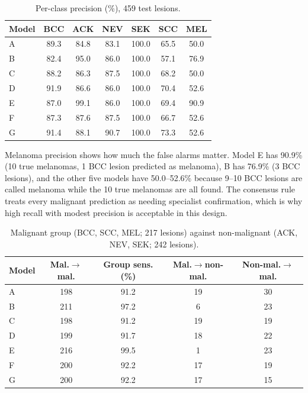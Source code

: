 \documentclass[conference]{IEEEtran}
\begin{document}
\begin{table}[!t]
\caption{Per-class precision (\%), 459 test lesions.}
\label{tab:prec}
\centering\scriptsize\setlength{\tabcolsep}{2.4pt}
\begin{tabular}{lcccccc}
\toprule
Model & BCC & ACK & NEV & SEK & SCC & MEL \\
\midrule
A & 89.3 & 84.8 & 83.1 & 100.0 & 65.5 & 50.0 \\
B & 82.4 & 95.0 & 86.0 & 100.0 & 57.1 & 76.9 \\
C & 88.2 & 86.3 & 87.5 & 100.0 & 68.2 & 50.0 \\
D & 91.9 & 86.6 & 86.0 & 100.0 & 70.4 & 52.6 \\
E & 87.0 & 99.1 & 86.0 & 100.0 & 69.4 & 90.9 \\
F & 87.3 & 87.6 & 87.5 & 100.0 & 66.7 & 52.6 \\
G & 91.4 & 88.1 & 90.7 & 100.0 & 73.3 & 52.6 \\
\bottomrule
\end{tabular}
\end{table}


Melanoma precision shows how much the false alarms matter. Model E has 90.9\% (10 true melanomas, 1 BCC lesion predicted as melanoma), B has 76.9\% (3 BCC lesions), and the other five models have 50.0--52.6\% because 9--10 BCC lesions are called melanoma while the 10 true melanomas are all found. The consensus rule treats every malignant prediction as needing specialist confirmation, which is why high recall with modest precision is acceptable in this design.

\begin{table}[!t]
\caption{Malignant group (BCC, SCC, MEL; 217 lesions) against non-malignant (ACK, NEV, SEK; 242 lesions).}
\label{tab:mal}
\centering\scriptsize\setlength{\tabcolsep}{2.4pt}
\begin{tabular}{lcccc}
\toprule
Model & Mal.$\to$mal. & Group sens. (\%) & Mal.$\to$non-mal. & Non-mal.$\to$mal. \\
\midrule
A & 198 & 91.2 & 19 & 30 \\
B & 211 & 97.2 & 6 & 23 \\
C & 198 & 91.2 & 19 & 19 \\
D & 199 & 91.7 & 18 & 22 \\
E & 216 & 99.5 & 1 & 23 \\
F & 200 & 92.2 & 17 & 19 \\
G & 200 & 92.2 & 17 & 15 \\
\bottomrule
\end{tabular}
\end{table}
\end{document}
